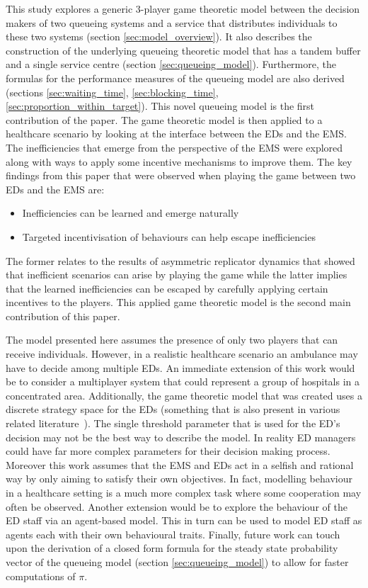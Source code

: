 This study explores a generic 3-player game theoretic model between the
decision makers of two queueing systems and a service that distributes
individuals to these two systems (section \ref{sec:model_overview}).
It also describes the construction of the underlying queueing theoretic model
that has a tandem buffer and a single service centre (section
\ref{sec:queueing_model}).
Furthermore, the formulas for the performance measures of the queueing model
are also derived (sections \ref{sec:waiting_time}, \ref{sec:blocking_time},
\ref{sec:proportion_within_target}).
This novel queueing model is the first contribution of the paper.
The game theoretic model is then applied to a healthcare scenario by looking at
the interface between the EDs and the EMS.
The inefficiencies that emerge from the perspective of the EMS were explored
along with ways to apply some incentive mechanisms to improve them.
The key findings from this paper that were observed when playing the game
between two EDs and the EMS are:
\begin{itemize}
    \item Inefficiencies can be learned and emerge naturally
    \item Targeted incentivisation of behaviours can help escape inefficiencies
\end{itemize}
The former relates to the results of asymmetric replicator dynamics that showed
that inefficient scenarios can arise by playing the game while the latter
implies that the learned inefficiencies can be escaped by carefully applying
certain incentives to the players.
This applied game theoretic model is the second main contribution of this paper.

The model presented here assumes the presence of only two players that can
receive individuals.
However, in a realistic healthcare scenario an ambulance may have to decide
among multiple EDs.
An immediate extension of this work would be to consider a multiplayer system
that could represent a group of hospitals in a concentrated area.
Additionally, the game theoretic model that was created uses a discrete
strategy space for the EDs (something that is also present in various related
literature~\cite{deo2011centralized, knight2017measuring}).
The single threshold parameter that is used for the ED's decision may not be
the best way to describe the model.
In reality ED managers could have far more complex parameters for their
decision making process.
Moreover this work assumes that the EMS and EDs act in a selfish and rational
way by only aiming to satisfy their own objectives.
In fact, modelling behaviour in a healthcare setting is a much more complex
task where some cooperation may often be observed.
Another extension would be to explore the behaviour of the ED staff via an
agent-based model.
This in turn can be used to model ED staff as agents each with their own
behavioural traits.
Finally, future work can touch upon the derivation of a closed form formula for
the steady state probability vector of the queueing model
(section \ref{sec:queueing_model}) to allow for faster computations of \(\pi\).